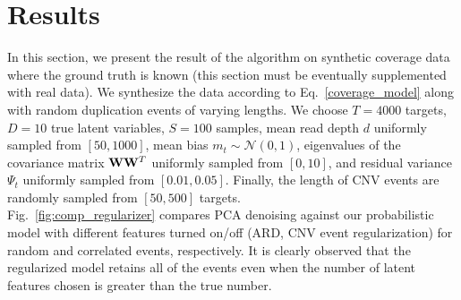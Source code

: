 \documentclass[nofootinbib,amssymb,amsmath]{revtex4}
\newcommand{\vW}{{\bf W}}
\newcommand{\norm}{{\mathcal N}}
\begin{document}
\section{Results}
In this section, we present the result of the algorithm on synthetic coverage data where the ground truth is known (this section must be eventually supplemented with real data). We synthesize the data according to Eq.~\eqref{coverage_model} along with random duplication events of varying lengths. We choose $T=4000$ targets, $D=10$ true latent variables, $S=100$ samples, mean read depth $d$ uniformly sampled from $[50, 1000]$, mean bias $m_t \sim \norm(0, 1)$, eigenvalues of the covariance matrix $\vW \vW^T$ uniformly sampled from $[0, 10]$, and residual variance $\Psi_t$ uniformly sampled from $[0.01, 0.05]$. Finally, the length of CNV events are randomly sampled from $[50, 500]$ targets.\\

Fig.~\ref{fig:comp_regularizer} compares PCA denoising against our probabilistic model with different features turned on/off (ARD, CNV event regularization) for random and correlated events, respectively. It is clearly observed that the regularized model retains all of the events even when the number of latent features chosen is greater than the true number.

\end{document}
